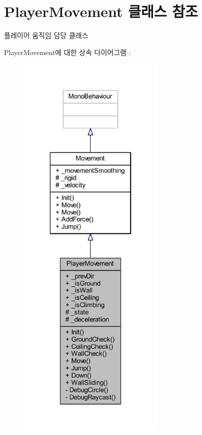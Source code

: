 \hypertarget{class_player_movement}{}\section{Player\+Movement 클래스 참조}
\label{class_player_movement}


플레이어 움직임 담당 클래스  




Player\+Movement에 대한 상속 다이어그램 \+: \nopagebreak
\begin{figure}[H]
\begin{center}
\leavevmode
\includegraphics[height=550pt]{de/d46/class_player_movement__inherit__graph}
\end{center}
\end{figure}


